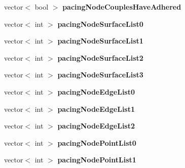 \begin{DoxyCompactItemize}
\item 
\hypertarget{classSimulation_acbe7ec70d295e436305c3e381d611005}{}vector$<$ bool $>$ {\bfseries pacing\+Node\+Couples\+Have\+Adhered}\label{classSimulation_acbe7ec70d295e436305c3e381d611005}

\item 
\hypertarget{classSimulation_a217551c21f0d872a258972f371aa54c0}{}vector$<$ int $>$ {\bfseries pacing\+Node\+Surface\+List0}\label{classSimulation_a217551c21f0d872a258972f371aa54c0}

\item 
\hypertarget{classSimulation_a2c1283e8412daa39cd84ddf7c14ec11f}{}vector$<$ int $>$ {\bfseries pacing\+Node\+Surface\+List1}\label{classSimulation_a2c1283e8412daa39cd84ddf7c14ec11f}

\item 
\hypertarget{classSimulation_afa387f640eafdbb1742029f1c8b0752d}{}vector$<$ int $>$ {\bfseries pacing\+Node\+Surface\+List2}\label{classSimulation_afa387f640eafdbb1742029f1c8b0752d}

\item 
\hypertarget{classSimulation_a185e29bd1c8d92480d8448e9ee46f29e}{}vector$<$ int $>$ {\bfseries pacing\+Node\+Surface\+List3}\label{classSimulation_a185e29bd1c8d92480d8448e9ee46f29e}

\item 
\hypertarget{classSimulation_a2834b8c926d53182b069443a0e3da2d4}{}vector$<$ int $>$ {\bfseries pacing\+Node\+Edge\+List0}\label{classSimulation_a2834b8c926d53182b069443a0e3da2d4}

\item 
\hypertarget{classSimulation_afe474f6c0c611852287bb4bb77291da3}{}vector$<$ int $>$ {\bfseries pacing\+Node\+Edge\+List1}\label{classSimulation_afe474f6c0c611852287bb4bb77291da3}

\item 
\hypertarget{classSimulation_a9fab424769ec800a71a14d8aeb702b25}{}vector$<$ int $>$ {\bfseries pacing\+Node\+Edge\+List2}\label{classSimulation_a9fab424769ec800a71a14d8aeb702b25}

\item 
\hypertarget{classSimulation_ab18e0143b6115308a8abab2f59166692}{}vector$<$ int $>$ {\bfseries pacing\+Node\+Point\+List0}\label{classSimulation_ab18e0143b6115308a8abab2f59166692}

\item 
\hypertarget{classSimulation_acf16b4b868f3530e441fc2b2ddce632e}{}vector$<$ int $>$ {\bfseries pacing\+Node\+Point\+List1}\label{classSimulation_acf16b4b868f3530e441fc2b2ddce632e}


\end{DoxyCompactItemize}
